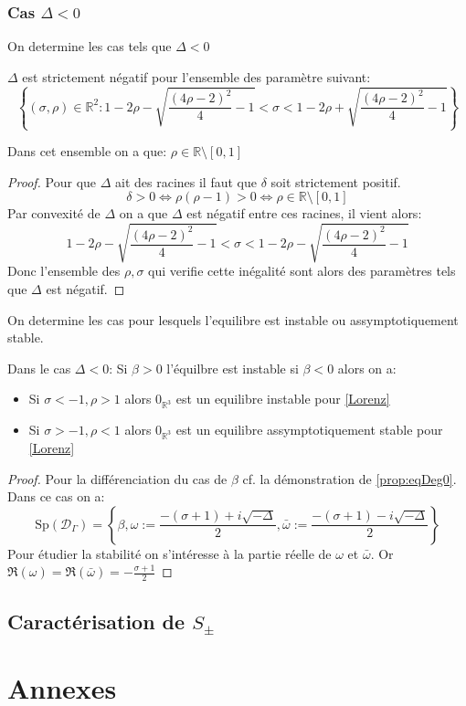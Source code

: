 \documentclass{article}
\newcommand{\R}{\mathbb{R}}
\newtheorem[M , nocut]{prop}{Proposition}[section]
\newtheorem[M]{propt}{Propriété}[section]
\newtheorem[L , nocut]{thm}{Théoreme}
\newtheorem[L]{cor}{Corollaire}
\begin{document}
\subsubsection*{Cas $\Delta < 0$}
On determine les cas tels que $\Delta<0$
\begin{prop}
    $\Delta$ est strictement négatif pour l'ensemble des paramètre suivant:
    \[
     \left\{(\sigma,\rho)\in \R ^2 : 1-2 \rho - \sqrt{ \frac{(4\rho-2)^2}{4} -1 }< \sigma < 1-2 \rho + \sqrt{ \frac{(4\rho-2)^2}{4} -1 } \right\}    
    \]
\end{prop}
\begin{example}[Remarque]
    Dans cet ensemble on a que: $\rho \in \R \setminus [0,1]$ 
\end{example}

\begin{proof}
    Pour que $\Delta$ ait des racines il faut que $\delta$ soit strictement positif.
    \[
    \delta > 0 \Leftrightarrow \rho(\rho-1) > 0 \Leftrightarrow \rho \in \R \setminus [0,1]
    \]Par convexité de $\Delta$ on a que $\Delta$ est négatif entre ces racines, il vient alors:
    \[
        1-2 \rho - \sqrt{ \frac{(4\rho-2)^2}{4} -1 } < \sigma < 1-2 \rho - \sqrt{ \frac{(4\rho-2)^2}{4} -1 }
    \]Donc l'ensemble des $\rho,\sigma$ qui verifie cette inégalité sont alors des paramètres tels que $\Delta$ est négatif.
\end{proof}
On determine les cas pour lesquels l'equilibre est instable ou assymptotiquement stable.
\begin{prop}
    Dans le cas $\Delta<0$:
    Si $\beta >0$ l'équilbre est instable si $\beta<0$ alors on a:
    \begin{itemize}
        \item Si $\sigma < -1 , \rho > 1$ alors $0_{\R^3}$ est un equilibre instable pour \eqref{Lorenz}
        \item Si $\sigma > -1 , \rho < 1$ alors $0_{\R^3}$ est un equilibre assymptotiquement stable pour \eqref{Lorenz}
    \end{itemize}
\end{prop}
\begin{proof}
    Pour la différenciation du cas de $\beta$ cf. la démonstration de \ref{prop:eqDeg0}. Dans ce cas on a:
    \[
        \mathrm{Sp}(\mathcal{D}_\Gamma) = \left\{\beta, \omega := \frac{-(\sigma+1)+ i \sqrt{-\Delta}}{2}, \bar{\omega} := \frac{-(\sigma+1)- i \sqrt{-\Delta}}{2}\right\}
    \]Pour étudier la stabilité on s'intéresse à la partie réelle de $\omega$ et $\bar{\omega}$. Or $\Re (\omega) = \Re (\bar{\omega}) = -\frac{\sigma+1}{2}$
\end{proof}
\subsection{Caractérisation de $S_\pm$}
\section{Annexes}
\end{document}
